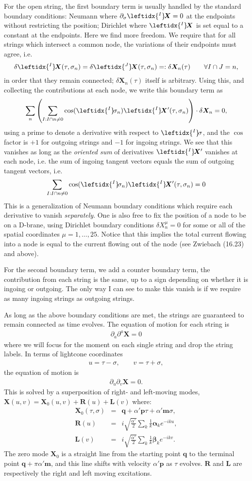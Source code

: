 \documentclass{revtex4}
\newcommand{\be}{\begin{eqnarray}}
\newcommand{\ee}{\end{eqnarray}}
\def\X{\bm{X}}
\def\L{\bm{\lambda}}
\def\p{\bm{p}}
\def\q{\bm{q}}
\def\a{\bm{a}}
\def\m{\bm{m}}
\def\b{\bm{b}}
\def\lI{\leftidx{^I} \! }
\def\lJ{\leftidx{^J} \! }
\def\L{\bm{L}}
\def\R{\bm{R}}
\def\a{\bm{\alpha}}
\def\b{\bm{\beta}}
\begin{document}
For the open string, the first boundary term is usually handled by the standard boundary conditions: Neumann where $\partial_\sigma \lI \X = 0$ at the endpoints without restricting the position; Dirichlet where $\lI \X$ is set equal to a constant at the endpoints. Here we find more freedom. We require that for all strings which intersect a common node, the variations of their endpoints must agree, i.e.
\be
\delta \lI \X(\tau, \sigma_n) = \delta \lJ \X(\tau, \sigma_n) =: \delta \X_n(\tau)  \qquad \forall I \cap J = n,
\ee
in order that they remain connected; $\delta \X_n(\tau)$ itself is arbitrary. Using this, and collecting the contributions at each node, we write this boundary term as
\be
\sum_n \left( \sum_{I:I\cap n \ne 0} \cos(\lI \sigma_n) \lI \X'(\tau, \sigma_n)\right) \cdot \delta \X_n = 0,
\ee
using a prime to denote a derivative with respect to $\lI \sigma$, and the $\cos$ factor is $+1$ for outgoing strings and $-1$ for ingoing strings.
We see that this vanishes as long as the \textit{oriented sum} of derivatives $\lI \X'$ vanishes at each node, i.e. the sum of ingoing tangent vectors equals the sum of outgoing tangent vectors, i.e.
\be
\label{BC2}
\sum_{I:I\cap n \ne 0} \cos(\lI \sigma_n) \lI \X'(\tau, \sigma_n) = 0
\ee
This is a generalization of Neumann boundary conditions which require each derivative to vanish \textit{separately}. One is also free to fix the position of a node to be on a D-brane, using Dirichlet boundary conditions $\delta X^\mu_n = 0$ for some or all of the spatial coordinates $\mu = 1, \ldots, 25$. Notice that this implies the total current flowing into a node is equal to the current flowing out of the node (see Zwiebach (16.23) and above).

For the second boundary term, we add a counter boundary term, the contribution from each string is the same, up to a sign depending on whether it is ingoing or outgoing. The only way I can see to make this vanish is if we require as many ingoing strings as outgoing strings.

As long as the above boundary conditions are met, the strings are guaranteed to remain connected as time evolves. The equation of motion for each string is
\be
\partial_a \partial^a \X = 0
\ee
where we will focus for the moment on each single string and drop the string labels.
In terms of lightcone coordinates
\be
u = \tau - \sigma, \qquad v = \tau + \sigma,
\ee
the equation of motion is
\be
\partial_u \partial_v \X = 0.
\ee
This is solved by a superposition of right- and left-moving modes, $\X(u,v) = \X_0(u,v) + \R(u) + \L(v)$ where:
\be
\X_0(\tau, \sigma) &=& \q + \alpha' \p \tau + \alpha' \m \sigma, \\[3pt]
\R(u) &=& i \sqrt{\frac{\alpha'}{2}} \sum_k \frac{1}{k} \a_k e^{-iku}, \\
\L(v) &=& i \sqrt{\frac{\alpha'}{2}} \sum_k \frac{1}{k} \b_k e^{-ikv}.
\ee
The zero mode $\X_0$ is a straight line from the starting point $\q$ to the terminal point $\q + \pi \alpha' \m $, and this line shifts with velocity $\alpha' \p$ as $\tau$ evolves. $\R$ and $\L$ are respectively the right and left moving excitations.
\end{document}

